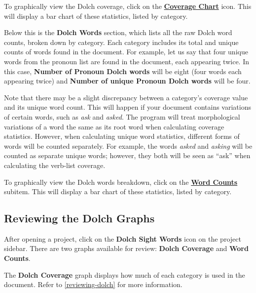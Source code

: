 \documentclass[
]{book}
\theoremstyle{definition}
\theoremstyle{definition}
\theoremstyle{definition}
\theoremstyle{definition}
\theoremstyle{remark}
\begin{document}
To graphically view the Dolch coverage, click on the \protect\hyperlink{reviewing-dolch-graphs}{\textbf{Coverage Chart}} icon. This will display a bar chart of these statistics, listed by category.

Below this is the \textbf{Dolch Words} section, which lists all the raw Dolch word counts, broken down by category. Each category includes its total and unique counts of words found in the document. For example, let us say that four unique words from the pronoun list are found in the document, each appearing twice. In this case, \textbf{Number of Pronoun Dolch words} will be eight (four words each appearing twice) and \textbf{Number of unique Pronoun Dolch words} will be four.

Note that there may be a slight discrepancy between a category's coverage value and its unique word count. This will happen if your document contains variations of certain words, such as \emph{ask} and \emph{asked}. The program will treat morphological variations of a word the same as its root word when calculating coverage statistics. However, when calculating unique word statistics, different forms of words will be counted separately. For example, the words \emph{asked} and \emph{asking} will be counted as separate unique words; however, they both will be seen as ``ask'' when calculating the verb-list coverage.

To graphically view the Dolch words breakdown, click on the \protect\hyperlink{reviewing-dolch-graphs}{\textbf{Word Counts}} subitem. This will display a bar chart of these statistics, listed by category.

\hypertarget{reviewing-dolch-graphs}{%
\subsection*{Reviewing the Dolch Graphs}\label{reviewing-dolch-graphs}}

After opening a project, click on the \textbf{Dolch Sight Words} icon on the project sidebar. There are two graphs available for review: \textbf{Dolch Coverage} and \textbf{Word Counts}.

The \textbf{Dolch Coverage} graph displays how much of each category is used in the document. Refer to \ref{reviewing-dolch} for more information.
\end{document}
